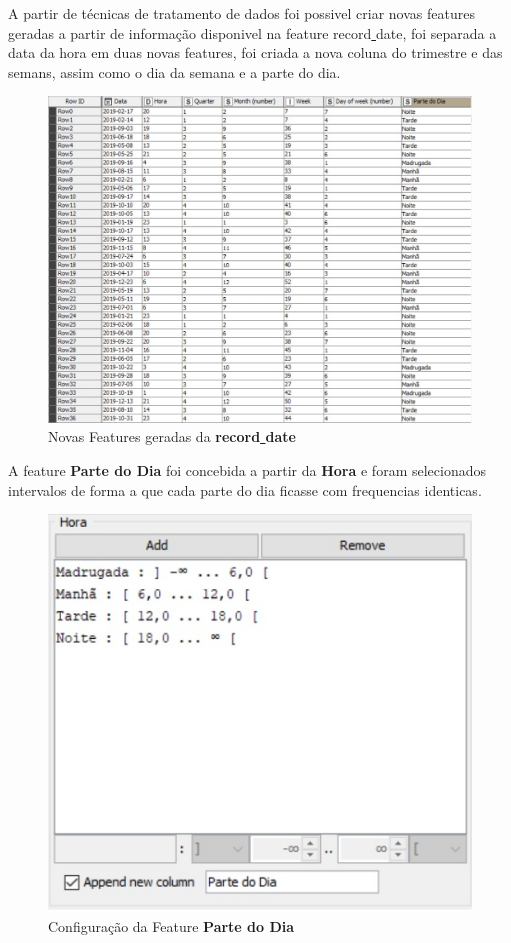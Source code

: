 \documentclass[a4paper,10pt]{article}
\begin{document}
A partir de técnicas de tratamento de dados foi possivel criar novas features geradas a partir de informação disponivel na feature record\underline{ }date, foi separada a data da hora em duas novas features, foi criada a nova coluna do trimestre e das semans, assim como o dia da semana e a parte do dia. 

\begin{figure} [ h! ]
  \centering
  \includegraphics[width=\linewidth]{imagens/DATAFE.jpg}
  \caption{Novas Features geradas da \textbf{record\underline{ }date}}
  \label{fig:DATAFE}
\end{figure}
\newpage
A feature \textbf{Parte do Dia} foi concebida a partir da \textbf{Hora} e foram selecionados intervalos de forma a que cada parte do dia ficasse com frequencias identicas. 

\begin{figure} [ h! ]
  \centering
  \includegraphics[width=0.5\linewidth]{imagens/partedodiacode.jpg}
  \caption{Configuração da Feature \textbf{Parte do Dia}}
  \label{fig:partedodiacode}
\end{figure}
\end{document}
